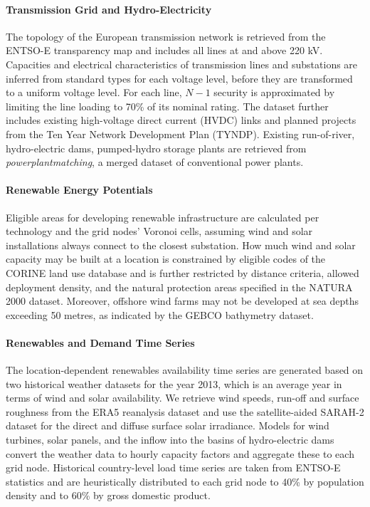 \paragraph{Transmission Grid and Hydro-Electricity}
The topology of the European transmission network is retrieved from the ENTSO-E
transparency map and includes all lines at and above 220 kV. Capacities and
electrical characteristics of transmission lines and substations are inferred
from standard types for each voltage level, before they are transformed to a
uniform voltage level. For each line, $N-1$ security is approximated by limiting
the line loading to 70\% of its nominal rating. The dataset further includes
existing high-voltage direct current (HVDC) links and planned projects from the
Ten Year Network Development Plan (TYNDP). Existing run-of-river, hydro-electric
dams, pumped-hydro storage plants are retrieved from
\textit{powerplantmatching}, a merged dataset of conventional power plants.


\paragraph{Renewable Energy Potentials}
Eligible areas for developing renewable infrastructure are calculated per
technology and the grid nodes' Voronoi cells, assuming wind and solar
installations always connect to the closest substation. How much wind and solar
capacity may be built at a location is constrained by eligible codes of the
CORINE land use database and is further restricted by distance criteria, allowed
deployment density, and the natural protection areas specified in the NATURA
2000 dataset. Moreover, offshore wind farms may not be developed at sea depths
exceeding 50 metres, as indicated by the GEBCO bathymetry dataset.


\paragraph{Renewables and Demand Time Series}
The location-dependent renewables availability time series are generated based
on two historical weather datasets for the year 2013, which is an average year
in terms of wind and solar availability. We retrieve wind speeds, run-off and
surface roughness from the ERA5 reanalysis dataset and use the satellite-aided
SARAH-2 dataset for the direct and diffuse surface solar irradiance. Models for
wind turbines, solar panels, and the inflow into the basins of hydro-electric
dams convert the weather data to hourly capacity factors and aggregate these to
each grid node. Historical country-level load time series are taken from ENTSO-E
statistics and are heuristically distributed to each grid node to 40\% by
population density and to 60\% by gross domestic product.

